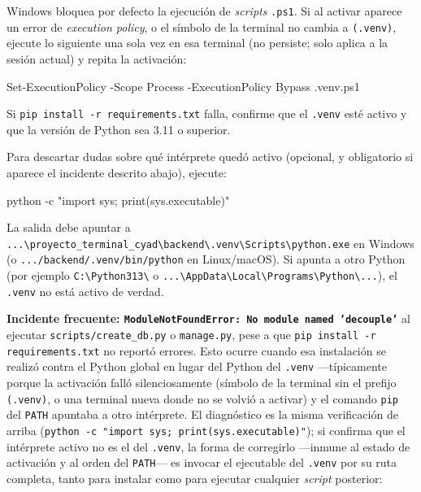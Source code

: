 Windows bloquea por defecto la ejecución de \emph{scripts} \texttt{.ps1}. Si al activar aparece un error de \emph{execution policy}, o el símbolo de la terminal no cambia a \texttt{(.venv)}, ejecute lo siguiente una sola vez en esa terminal (no persiste; solo aplica a la sesión actual) y repita la activación:

\begin{Comandos}
Set-ExecutionPolicy -Scope Process -ExecutionPolicy Bypass
.venv\Scripts\Activate.ps1
\end{Comandos}

Si \texttt{pip install -r requirements.txt} falla, confirme que el \texttt{.venv} esté activo y que la versión de Python sea 3.11 o superior.

Para descartar dudas sobre qué intérprete quedó activo (opcional, y obligatorio si aparece el incidente descrito abajo), ejecute:

\begin{Comandos}
python -c "import sys; print(sys.executable)"
\end{Comandos}

La salida debe apuntar a \texttt{...\textbackslash\allowbreak proyecto_terminal_cyad\textbackslash\allowbreak backend\textbackslash\allowbreak .venv\textbackslash\allowbreak Scripts\textbackslash\allowbreak python.exe} en Windows (o \texttt{.../backend/.venv/bin/python} en Linux/macOS). Si apunta a otro Python (por ejemplo \texttt{C:\textbackslash\allowbreak Python313\textbackslash} o \texttt{...\textbackslash\allowbreak AppData\textbackslash\allowbreak Local\textbackslash\allowbreak Programs\textbackslash\allowbreak Python\textbackslash...}), el \texttt{.venv} no está activo de verdad.

\textbf{Incidente frecuente: \texttt{ModuleNotFoundError: No module named 'decouple'}} al ejecutar \texttt{scripts/create\_db.py} o \texttt{manage.py}, pese a que \texttt{pip install -r requirements.txt} no reportó errores. Esto ocurre cuando esa instalación se realizó contra el Python global en lugar del Python del \texttt{.venv} —típicamente porque la activación falló silenciosamente (símbolo de la terminal sin el prefijo \texttt{(.venv)}, o una terminal nueva donde no se volvió a activar) y el comando \texttt{pip} del \texttt{PATH} apuntaba a otro intérprete. El diagnóstico es la misma verificación de arriba (\texttt{python -c "import sys; print(sys.executable)"}); si confirma que el intérprete activo no es el del \texttt{.venv}, la forma de corregirlo —inmune al estado de activación y al orden del \texttt{PATH}— es invocar el ejecutable del \texttt{.venv} por su ruta completa, tanto para instalar como para ejecutar cualquier \emph{script} posterior:

